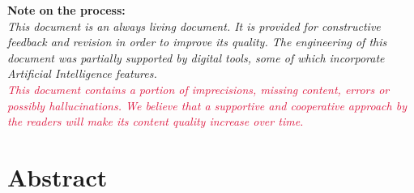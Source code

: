 \documentclass[11pt,a4paper,twoside]{book}
\begin{document}
\begin{titlepage}
\vspace{0.6cm}

\begin{minipage}{0.85\textwidth}
\small\noindent\textbf{Note on the process:}\\
\textit{This document is an always living document.
It is provided for constructive feedback and revision in order to improve
its quality. The engineering of this document was partially supported by
digital tools, some of which incorporate Artificial Intelligence features.}\\[3pt]
\textcolor{Crimson}{\textit{This document contains a portion of imprecisions,
missing content, errors or possibly hallucinations. We believe that a
supportive and cooperative approach by the readers will make its content
quality increase over time.}}
\end{minipage}

\vspace{1.5cm}
\end{titlepage}

\frontmatter
\hypersetup{pageanchor=true}



\section*{Abstract}

\newpage



\tableofcontents
\listoffigures
\listoftables

\mainmatter



\backmatter



\printbibliography
\end{document}

